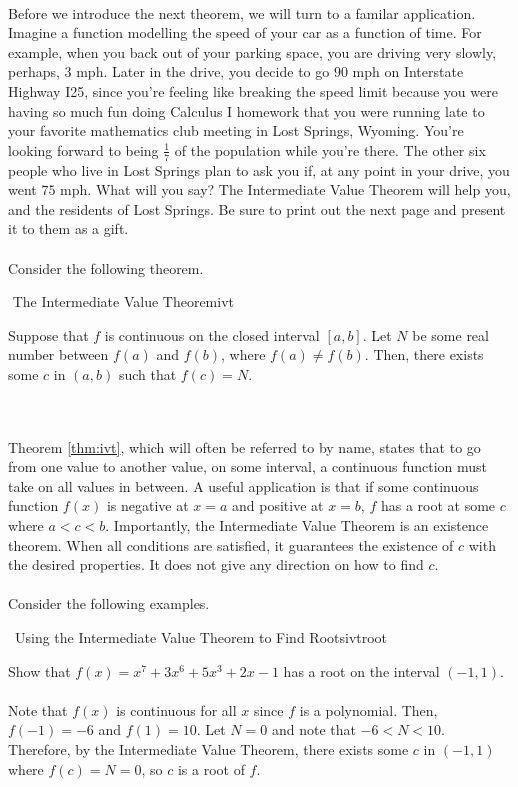         \\
        Before we introduce the next theorem, we will turn to a familar application. Imagine a function modelling the speed of your car as a function of time. For example, when you back out of your parking space, you are driving very slowly, perhaps, \(3\text{ mph}\). Later in the drive, you decide to go \(90\text{ mph}\) on Interstate Highway I25, since you're feeling like breaking the speed limit because you were having so much fun doing Calculus I homework that you were running late to your favorite mathematics club meeting in Lost Springs, Wyoming. You're looking forward to being \(\frac{1}{7}\) of the population while you're there. The other six people who live in Lost Springs plan to ask you if, at any point in your drive, you went \(75\text{ mph}\). What will you say? The Intermediate Value Theorem will help you, and the residents of Lost Springs. Be sure to print out the next page and present it to them as a gift.
        \pagebreak
        \\
        \\
        Consider the following theorem.
        \begin{theorem}{\Stop\,\,The Intermediate Value Theorem}{ivt}

            Suppose that \(f\) is continuous on the closed interval \([a,b]\). Let \(N\) be some real number between \(f(a)\) and \(f(b)\), where \(f(a)\neq f(b)\). Then, there exists some \(c\) in \((a,b)\) such that \(f(c)=N\).
            
        \end{theorem}
        \vphantom
        \\
        \\
        Theorem \ref{thm:ivt}, which will often be referred to by name, states that to go from one value to another value, on some interval, a continuous function must take on all values in between. A useful application is that if some continuous function \(f(x)\) is negative at \(x=a\) and positive at \(x=b\), \(f\) has a root at some \(c\) where \(a<c<b\). Importantly, the Intermediate Value Theorem is an existence theorem. When all conditions are satisfied, it guarantees the existence of \(c\) with the desired properties. It does not give any direction on how to find \(c\).
        \\
        \\
        Consider the following examples. 
        \begin{example}{\Difficulty\,\Difficulty\,\,Using the Intermediate Value Theorem to Find Roots}{ivtroot}

            Show that \(f(x)=x^7+3x^6+5x^3+2x-1\) has a root on the interval \((-1,1)\). 
            \\
            \\
            Note that \(f(x)\) is continuous for all \(x\) since \(f\) is a polynomial. Then, \(f(-1)=-6\) and \(f(1)=10\). Let \(N=0\) and note that \(-6<N<10\). Therefore, by the Intermediate Value Theorem, there exists some \(c\) in \((-1,1)\) where \(f(c)=N=0\), so \(c\) is a root of \(f\).

        \end{example}
